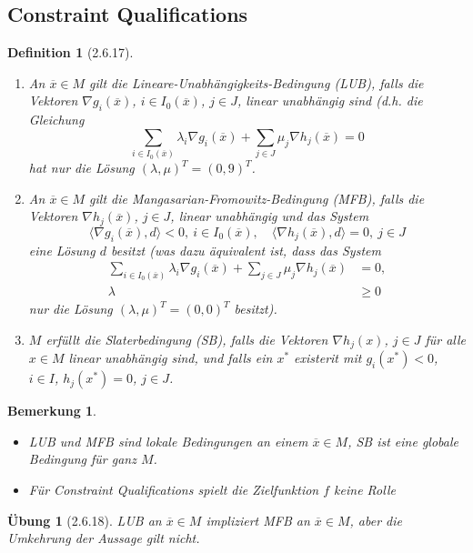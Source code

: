 \documentclass[12pt]{extreport} %
\theoremstyle{named}
\theoremstyle{nnamed}
\theoremstyle{itshape}
\newtheorem*{definition}{Definition}
\theoremstyle{normal}
\newtheorem*{bemerkung}{Bemerkung}
\newtheorem*{uebung}{Übung}
\begin{document}
\subsection{Constraint Qualifications}
	
\begin{definition}[2.6.17] ~\
	\begin{enumerate}
		\item An $\overline{x} \in M$ gilt die Lineare-Unabhängigkeits-Bedingung (LUB), falls die Vektoren $\nabla g_i(\overline{x})$, $i \in I_0(\overline{x})$, $j \in J$, linear unabhängig sind (d.h. die Gleichung
			$$ \sum_{i \in I_0(\overline{x})} \lambda_i \nabla g_i(\overline{x}) + \sum_{j \in J} \mu_j \nabla h_j(\overline{x}) = 0 $$
			hat nur die Lösung $(\lambda, \mu)^T = (0, 9)^T$.
		\item An $\overline{x} \in M$ gilt die Mangasarian-Fromowitz-Bedingung (MFB), falls die Vektoren $\nabla h_j(\overline{x})$, $j \in J$, linear unabhängig und das System
			$$ \langle \nabla g_i(\overline{x}), d \rangle < 0, ~i \in I_0(\overline{x}), \quad \langle \nabla h_j(\overline{x}), d \rangle = 0, ~j \in J $$
			eine Lösung $d$ besitzt (was dazu äquivalent ist, dass das System
			\begin{align*}
				\sum_{i \in I_0(\overline{x})} \lambda_i \nabla g_i(\overline{x}) + \sum_{j \in J} \mu_j \nabla h_j(\overline{x}) & = 0, \\
				\lambda & \geq 0
			\end{align*} 
			nur die Lösung $(\lambda, \mu)^T = (0, 0)^T$ besitzt).
		\item $M$ erfüllt die Slaterbedingung (SB), falls die Vektoren $\nabla h_j(x)$, $j \in J$ für alle $x \in M$ linear unabhängig sind, und falls ein $x^*$ existerit mit $g_i(x^*) < 0$, $i \in I$, $h_j(x^*) = 0$, $j \in J$.
	\end{enumerate}
\end{definition}
	
\begin{bemerkung} ~\
	\begin{itemize}
		\item LUB und MFB sind lokale Bedingungen an einem $\overline{x} \in M$, SB ist eine globale Bedingung für ganz $M$.
		\item Für Constraint Qualifications spielt die Zielfunktion $f$ keine Rolle 
	\end{itemize}	
\end{bemerkung}

\begin{uebung}[2.6.18]
	LUB an $\overline{x} \in M$ impliziert MFB an $\overline{x} \in M$, aber die Umkehrung der Aussage gilt nicht.	
\end{uebung}
\end{document}
